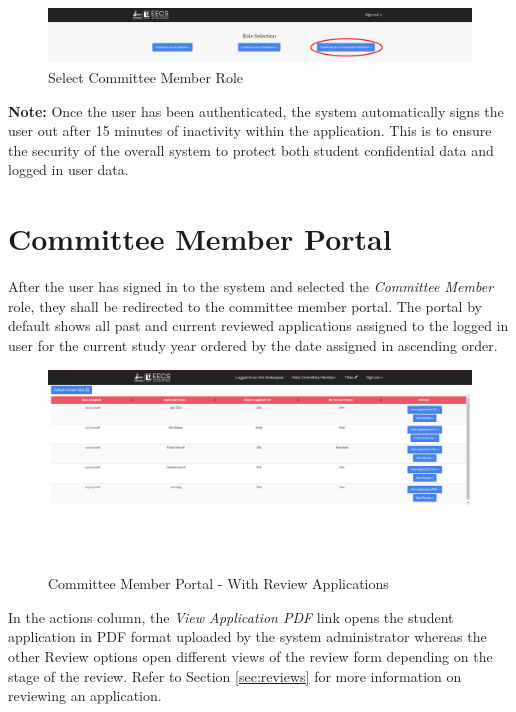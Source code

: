 \documentclass[fontsize=12pt,paper=letter,twoside]{scrartcl}
\begin{document}
\begin{figure}[!htb]
\begin{center}
\includegraphics[width=.9\textwidth]{images/auth.png}
\end{center}
\caption{Select Committee Member Role}
\label{fig:role_selection}
\end{figure}

\bigskip
\noindent \textbf{Note:} Once the user has been authenticated, the system automatically signs the user out after 15 minutes of inactivity within the application. This is to ensure the security of the overall system to protect both student confidential data and logged in user data.


\section{Committee Member Portal}

After the user has signed in to the system and selected the \emph{Committee Member} role, they shall be redirected to the committee member portal. The portal by default shows all past and current reviewed applications assigned to the logged in user for the current study year ordered by the date assigned in ascending order.

\begin{figure}[!htb]
\begin{center}
\includegraphics[width=.8\textwidth]{images/default_table.png}
\end{center}
\caption{Committee Member Portal - With Review Applications}
\label{fig:cm_portal}
\end{figure}

\bigskip
\noindent In the actions column, the \emph{View Application PDF} link opens the student application in PDF format uploaded by the system administrator whereas the other Review options open different views of the review form depending on the stage of the review. Refer to Section \ref{sec:reviews} for more information on reviewing an application.
\end{document}
